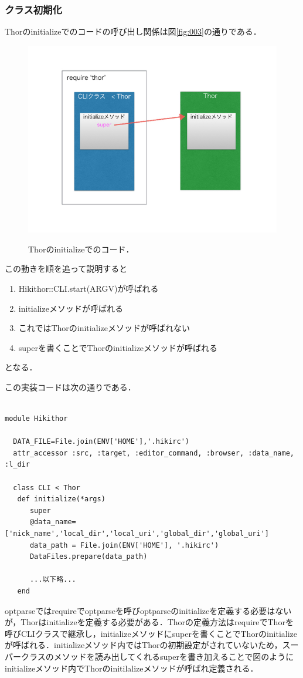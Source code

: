 \subsubsection{クラス初期化}
Thorのinitializeでのコードの呼び出し関係は図\ref{fig:003}の通りである．

\begin{figure}[htbp]\begin{center}
\includegraphics[width=12cm,bb= 0 0 737 553]{../figs/./hikiutils_yamane.003.jpg}
\caption{Thorのinitializeでのコード．}
\label{fig:003}
\label{default}\end{center}\end{figure}
この動きを順を追って説明すると

\begin{enumerate}
\item Hikithor::CLI.start(ARGV)が呼ばれる
\item initializeメソッドが呼ばれる
\item これではThorのinitializeメソッドが呼ばれない
\item superを書くことでThorのinitializeメソッドが呼ばれる
\end{enumerate}
となる．

この実装コードは次の通りである．
\begin{lstlisting}[style=customRuby,basicstyle={\scriptsize\ttfamily}]

module Hikithor

  DATA_FILE=File.join(ENV['HOME'],'.hikirc')
  attr_accessor :src, :target, :editor_command, :browser, :data_name, :l_dir

  class CLI < Thor
   def initialize(*args)
      super
      @data_name=['nick_name','local_dir','local_uri','global_dir','global_uri']
      data_path = File.join(ENV['HOME'], '.hikirc')
      DataFiles.prepare(data_path)

      ...以下略...
   end
\end{lstlisting}
optparseではrequireでoptparseを呼びoptparseのinitializeを定義する必要はないが，Thorはinitializeを定義する必要がある．Thorの定義方法はrequireでThorを呼びCLIクラスで継承し，initializeメソッドにsuperを書くことでThorのinitializeが呼ばれる．initializeメソッド内ではThorの初期設定がされていないため，スーパークラスのメソッドを読み出してくれるsuperを書き加えることで図のようにinitializeメソッド内でThorのinitilalizeメソッドが呼ばれ定義される．

